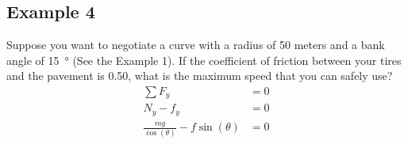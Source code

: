 \documentclass{article}
\begin{document}
\subsection{Example 4}

Suppose you want to negotiate a curve with a radius of 50 meters and a bank angle of \SI{15}{\degree} (See the Example 1). If the coefficient of friction between your tires and the pavement is 0.50, what is the maximum speed that you can safely use?
\begin{align*}
	\sum F_y & = 0 \\
	N_y - f_y & = 0 \\
	\frac{ mg }{ \cos(\theta) } - f\sin(\theta) & = 0
\end{align*}
\end{document}
